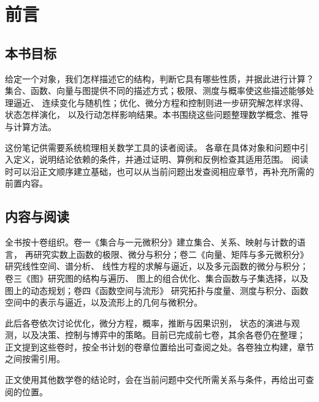 \chapter*{前言}

\section*{本书目标}

给定一个对象，我们怎样描述它的结构，判断它具有哪些性质，并据此进行计算？
集合、函数、向量与图提供不同的描述方式；极限、测度与概率使这些描述能够处理逼近、
连续变化与随机性；优化、微分方程和控制则进一步研究解怎样求得、状态怎样演化，
以及行动怎样影响结果。本书围绕这些问题整理数学概念、推导与计算方法。

这份笔记供需要系统梳理相关数学工具的读者阅读。
各章在具体对象和问题中引入定义，说明结论依赖的条件，并通过证明、算例和反例检查其适用范围。
阅读时可以沿正文顺序建立基础，也可以从当前问题出发查阅相应章节，再补充所需的前置内容。

\section*{内容与阅读}

全书按十卷组织。卷一《集合与一元微积分》建立集合、关系、映射与计数的语言，
再研究实数上函数的极限、微分与积分；卷二《向量、矩阵与多元微积分》研究线性空间、谱分析、
线性方程的求解与逼近，以及多元函数的微分与积分；卷三《图》研究图的结构与遍历、
图上的组合优化、集合函数与子集选择，以及图上的动态规划；卷四《函数空间与流形》
研究拓扑与度量、测度与积分、函数空间中的表示与逼近，以及流形上的几何与微积分。

此后各卷依次讨论优化，微分方程，概率，推断与因果识别，
状态的演进与观测，以及决策、控制与博弈中的策略。目前已完成前七卷，其余各卷仍在整理；
正文提到这些卷时，按全书计划的卷章位置给出可查阅之处。各卷独立构建，章节之间按需引用。

正文使用其他数学卷的结论时，会在当前问题中交代所需关系与条件，再给出可查阅的位置。
